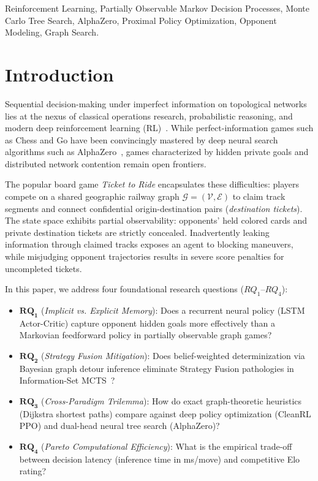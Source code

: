 \documentclass[conference,10pt]{IEEEtran}
\begin{document}
\begin{IEEEkeywords}
Reinforcement Learning, Partially Observable Markov Decision Processes, Monte Carlo Tree Search, AlphaZero, Proximal Policy Optimization, Opponent Modeling, Graph Search.
\end{IEEEkeywords}

\section{Introduction}
\label{sec:intro}
Sequential decision-making under imperfect information on topological networks lies at the nexus of classical operations research, probabilistic reasoning, and modern deep reinforcement learning (RL)~\cite{sutton2018reinforcement}. While perfect-information games such as Chess and Go have been convincingly mastered by deep neural search algorithms such as AlphaZero~\cite{silver2017mastering, silver2018general}, games characterized by hidden private goals and distributed network contention remain open frontiers.

The popular board game \textit{Ticket to Ride} encapsulates these difficulties: players compete on a shared geographic railway graph $\mathcal{G} = (\mathcal{V}, \mathcal{E})$ to claim track segments and connect confidential origin-destination pairs (\textit{destination tickets}). The state space exhibits partial observability: opponents' held colored cards and private destination tickets are strictly concealed. Inadvertently leaking information through claimed tracks exposes an agent to blocking maneuvers, while misjudging opponent trajectories results in severe score penalties for uncompleted tickets.

In this paper, we address four foundational research questions ($RQ_1$--$RQ_4$):
\begin{itemize}
    \item $\mathbf{RQ_1}$ (\textit{Implicit vs. Explicit Memory}): Does a recurrent neural policy (LSTM Actor-Critic) capture opponent hidden goals more effectively than a Markovian feedforward policy in partially observable graph games?
    \item $\mathbf{RQ_2}$ (\textit{Strategy Fusion Mitigation}): Does belief-weighted determinization via Bayesian graph detour inference eliminate Strategy Fusion pathologies in Information-Set MCTS~\cite{cowling2012information}?
    \item $\mathbf{RQ_3}$ (\textit{Cross-Paradigm Trilemma}): How do exact graph-theoretic heuristics (Dijkstra shortest paths) compare against deep policy optimization (CleanRL PPO) and dual-head neural tree search (AlphaZero)?
    \item $\mathbf{RQ_4}$ (\textit{Pareto Computational Efficiency}): What is the empirical trade-off between decision latency (inference time in ms/move) and competitive Elo rating?
\end{itemize}
\end{document}
